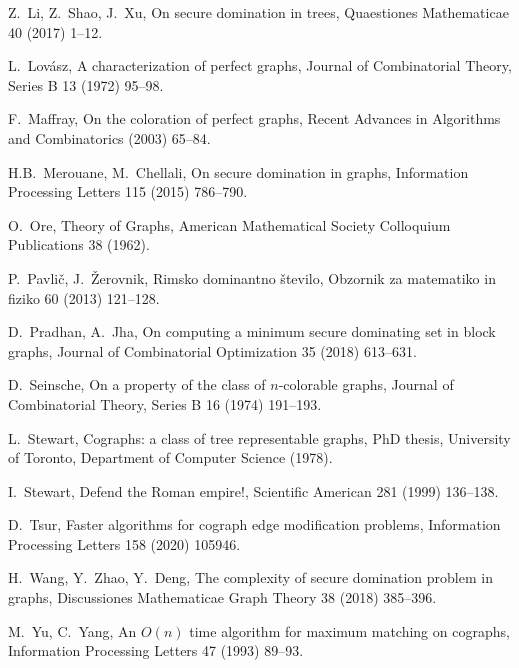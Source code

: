 \documentclass[12pt,a4paper,twoside]{article}
\theoremstyle{definition} %
\theoremstyle{plain} %
\numberwithin{equation}{section}  %
\begin{document}
\begin{thebibliography}{99}
    Z.~Li, Z.~Shao, J.~Xu,
    On secure domination in trees,
    Quaestiones Mathematicae 40 (2017) 1--12.
    
    L.~Lovász,
    A characterization of perfect graphs,
    Journal of Combinatorial Theory, Series B 13 (1972) 95--98.
    
    F.~Maffray,
    On the coloration of perfect graphs,
    Recent Advances in Algorithms and Combinatorics (2003) 65--84.
 
    H.B.~Merouane, M.~Chellali,
    On secure domination in graphs,
    Information Processing Letters 115 (2015) 786--790.
    
    O.~Ore,
    Theory of Graphs,
    American Mathematical Society Colloquium Publications 38 (1962).

    P.~Pavlič, J.~Žerovnik,
    Rimsko dominantno število,
    Obzornik za matematiko in fiziko 60 (2013) 121--128.
    
    D.~Pradhan, A.~Jha,
    On computing a minimum secure dominating set in block graphs,
    Journal of Combinatorial Optimization 35 (2018) 613--631.
    
    D.~Seinsche,
    On a property of the class of $n$-colorable graphs,
    Journal of Combinatorial Theory, Series B 16 (1974) 191--193.
    
    L.~Stewart,
    Cographs: a class of tree representable graphs,
    PhD thesis,
    University of Toronto, Department of Computer Science (1978).
    
    I.~Stewart,
    Defend the Roman empire!,
    Scientific American 281 (1999) 136--138.
    
    D.~Tsur,
    Faster algorithms for cograph edge modification problems,
    Information Processing Letters 158 (2020) 105946. 

    H.~Wang, Y.~Zhao, Y.~Deng,
    The complexity of secure domination problem in graphs,
    Discussiones Mathematicae Graph Theory 38 (2018) 385--396.
    
    M.~Yu, C.~Yang,
    An $O(n)$ time algorithm for maximum matching on cographs,
    Information Processing Letters 47 (1993) 89--93.
    
\end{thebibliography}



\cleardoublepage                           %
\printindex
\end{document}
